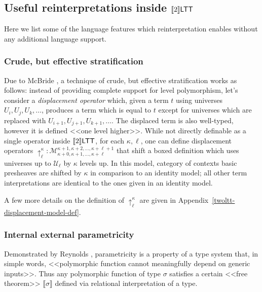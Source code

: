 \subsection{Useful reinterpretations inside
\texorpdfstring{$\llbracket 2\rrbracket\mathsf{LTT}$}{[[2]]LTT}}
\label{twoLTT-applications}

Here we list some of the language features which
reinterpretation enables without any additional language
support.

\subsubsection{Crude, but effective stratification}
\label{twoLTT-displacement}

Due to McBride \cite{McBride:Crude2011,
McBride:Crude2012}, a technique of crude, but effective
stratification works as follows: instead of providing
complete support for level polymorphism, let's consider
a \textit{displacement operator} which, given a term $t$
using universes $U_i,U_j,U_k,\ldots$, produces a term
which is equal to $t$ except for universes which are
replaced with $U_{i+1},U_{j+1},U_{k+1},\ldots$. The
displaced term is also well-typed, however it is defined
<<one level higher>>. While not directly definable as a
single operator inside $\llbracket 2\rrbracket\mathsf{LTT}$, for each
$\kappa,\ell$, one can define displacement operators
$\uparrow_\ell^\kappa:\mathcal{M}_{\kappa+0,
\kappa+1,\ldots,\kappa+\ell}^{\kappa+1,\kappa+2,\ldots,
\kappa+\ell+1}$ that shift a boxed definition which
uses universes up to $\mathcal{U}_\ell$ by $\kappa$
levels up. In this model, category of contexts basic
presheaves are shifted by $\kappa$ in comparison to an
identity model; all other term interpretations are
identical to the ones given in an identity model.

A few more details on the definition of
$\uparrow_\ell^\kappa$ are given in
Appendix~\ref{twoltt-displacement-model-def}.

\subsubsection{Internal external parametricity}
\label{twoLTT-parametricity}

Demonstrated by Reynolds \cite{reynolds1983types},
parametricity is a property of a type system that, in
simple words, <<polymorphic function cannot
meaningfully depend on generic inputs>>. Thus any
polymorphic function of type $\sigma$ satisfies a
certain <<free theorem>> $\llbracket \sigma
\rrbracket$ defined via relational interpretation of a
type.

